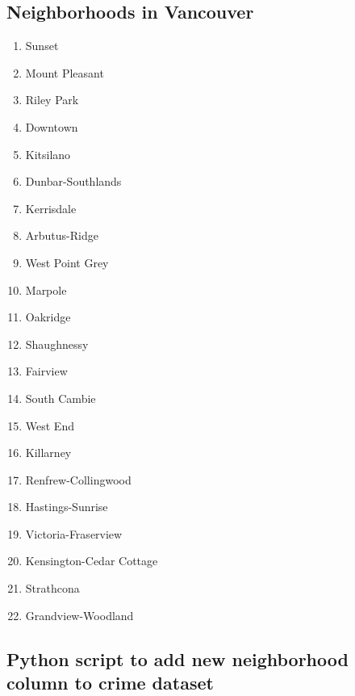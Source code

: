 \documentclass[conference]{IEEEtran}
\begin{document}
    \appendix

    \subsection{Neighborhoods in Vancouver}
    \begin{enumerate}
        \item Sunset
        \item Mount Pleasant
        \item Riley Park
        \item Downtown
        \item Kitsilano
        \item Dunbar-Southlands
        \item Kerrisdale
        \item Arbutus-Ridge
        \item West Point Grey
        \item Marpole
        \item Oakridge
        \item Shaughnessy
        \item Fairview
        \item South Cambie
        \item West End
        \item Killarney
        \item Renfrew-Collingwood
        \item Hastings-Sunrise
        \item Victoria-Fraserview
        \item Kensington-Cedar Cottage
        \item Strathcona
        \item Grandview-Woodland
    \end{enumerate}

    \subsection{Python script to add new neighborhood column to crime dataset}
\end{document}
